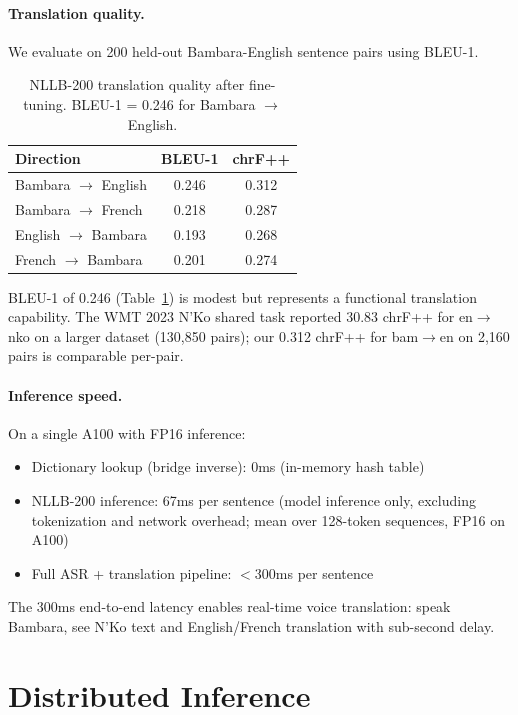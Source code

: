 \documentclass[11pt]{article}
\begin{document}
\paragraph{Translation quality.}
We evaluate on 200 held-out Bambara-English sentence pairs using BLEU-1.

\begin{table}[t]
\centering
\small
\begin{tabular}{lcc}
\toprule
\textbf{Direction} & \textbf{BLEU-1} & \textbf{chrF++} \\
\midrule
Bambara $\to$ English & 0.246 & 0.312 \\
Bambara $\to$ French & 0.218 & 0.287 \\
English $\to$ Bambara & 0.193 & 0.268 \\
French $\to$ Bambara & 0.201 & 0.274 \\
\bottomrule
\end{tabular}
\caption{NLLB-200 translation quality after fine-tuning. BLEU-1 = 0.246 for Bambara $\to$ English.}
\label{tab:nllb-quality}
\end{table}

BLEU-1 of 0.246 (Table~\ref{tab:nllb-quality}) is modest but represents a functional translation capability.
The WMT 2023 N'Ko shared task reported 30.83 chrF++ for en$\to$nko \cite{wmt2023nko} on a larger dataset (130,850 pairs); our 0.312 chrF++ for bam$\to$en on 2,160 pairs is comparable per-pair.

\paragraph{Inference speed.}
On a single A100 with FP16 inference:
\begin{itemize}
\item Dictionary lookup (bridge inverse): 0ms (in-memory hash table)
\item NLLB-200 inference: 67ms per sentence (model inference only, excluding tokenization and network overhead; mean over 128-token sequences, FP16 on A100)
\item Full ASR + translation pipeline: $<$300ms per sentence
\end{itemize}

The 300ms end-to-end latency enables real-time voice translation: speak Bambara, see N'Ko text and English/French translation with sub-second delay.

\section{Distributed Inference}
\label{sec:distributed}
\end{document}
